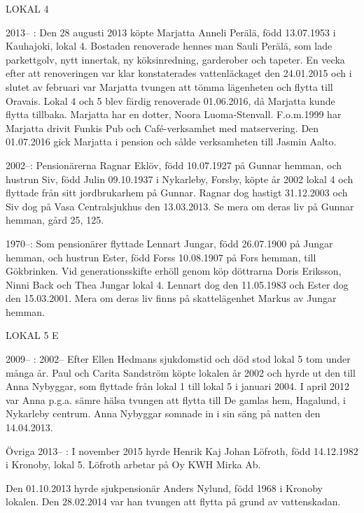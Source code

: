 LOKAL 4

 2013-- :
Den 28 augusti 2013 köpte Marjatta Anneli Perälä, född 13.07.1953 i Kauhajoki, lokal 4.	 Bostaden renoverade hennes man Sauli Perälä, som lade parkettgolv, nytt innertak, ny köksinredning, garderober och tapeter. En vecka efter att renoveringen var klar konstaterades vattenläckaget den 24.01.2015 och i slutet av februari var Marjatta tvungen att tömma lägenheten och flytta till Oravais. Lokal 4 och 5 blev färdig renoverade 01.06.2016, då Marjatta kunde flytta tillbaka. Marjatta har en dotter, Noora Luoma-Stenvall. F.o.m.1999 har Marjatta drivit Funkis Pub och Café-verksamhet med matservering. Den 01.07.2016 gick Marjatta i pension och sålde verksamheten till Jasmin Aalto.

 2002--:
Pensionärerna Ragnar Eklöv, född 10.07.1927 på Gunnar hemman, och hustrun Siv, född Julin 09.10.1937 i Nykarleby, Forsby, köpte år 2002 lokal 4 och flyttade från sitt jordbrukarhem på Gunnar. Ragnar dog hastigt 31.12.2003 och Siv dog på Vasa Centralsjukhus den 13.03.2013. Se mera om deras liv på Gunnar hemman, gård 25, 125.

 1970--:
Som pensionärer flyttade Lennart Jungar, född 26.07.1900 på Jungar hemman, och hustrun Ester, född Forss 10.08.1907 på Fors hemman, till Gökbrinken. Vid generationsskifte erhöll genom köp döttrarna Doris Eriksson, Ninni Back och Thea Jungar lokal 4. Lennart dog den 11.05.1983 och Ester dog den 15.03.2001. Mera om deras liv finns på skattelägenhet Markus av Jungar hemman.


LOKAL 5 E

 2009-- :
 2002--
Efter Ellen Hedmans sjukdomstid och död stod lokal 5 tom under många år. Paul och Carita Sandström köpte lokalen år 2002 och hyrde ut den till Anna Nybyggar, som flyttade från lokal 1 till lokal 5 i januari 2004.  I april 2012 var Anna p.g.a. sämre hälsa tvungen att flytta till De gamlas hem, Hagalund, i Nykarleby centrum. Anna Nybyggar somnade in i sin säng på natten den 14.04.2013.


Övriga  2013-- :
I november 2015 hyrde Henrik Kaj Johan Löfroth, född 14.12.1982 i Kronoby, lokal 5. Löfroth arbetar på Oy KWH Mirka Ab.

Den 01.10.2013 hyrde sjukpensionär Anders Nylund, född 1968 i Kronoby lokalen. Den 28.02.2014 var han tvungen att flytta på grund av vattenskadan.

